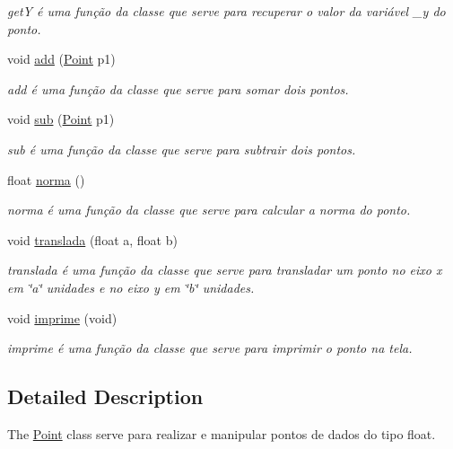 \begin{DoxyCompactItemize}
\begin{DoxyCompactList}\small\item\em getY é uma função da classe que serve para recuperar o valor da variável \+\_\+y do ponto. \end{DoxyCompactList}\item 
void \mbox{\hyperlink{class_point_a6bcf8fd2524ecc4d5b6c1dc942d541a5}{add}} (\mbox{\hyperlink{class_point}{Point}} p1)
\begin{DoxyCompactList}\small\item\em add é uma função da classe que serve para somar dois pontos. \end{DoxyCompactList}\item 
void \mbox{\hyperlink{class_point_af7d9e533f0030edf4ab28fdc0f12acd4}{sub}} (\mbox{\hyperlink{class_point}{Point}} p1)
\begin{DoxyCompactList}\small\item\em sub é uma função da classe que serve para subtrair dois pontos. \end{DoxyCompactList}\item 
float \mbox{\hyperlink{class_point_abd2618d1f505d9392893273a66e7c9b2}{norma}} ()
\begin{DoxyCompactList}\small\item\em norma é uma função da classe que serve para calcular a norma do ponto. \end{DoxyCompactList}\item 
void \mbox{\hyperlink{class_point_ad9676e36f3444534b609e3c68422239a}{translada}} (float a, float b)
\begin{DoxyCompactList}\small\item\em translada é uma função da classe que serve para transladar um ponto no eixo x em \char`\"{}a\char`\"{} unidades e no eixo y em \char`\"{}b\char`\"{} unidades. \end{DoxyCompactList}\item 
\mbox{\label{class_point_a188350fb70e5b297a659a31ab8887ca3}} 
void \mbox{\hyperlink{class_point_a188350fb70e5b297a659a31ab8887ca3}{imprime}} (void)
\begin{DoxyCompactList}\small\item\em imprime é uma função da classe que serve para imprimir o ponto na tela. \end{DoxyCompactList}\end{DoxyCompactItemize}


\subsection{Detailed Description}
The \mbox{\hyperlink{class_point}{Point}} class serve para realizar e manipular pontos de dados do tipo float. 

